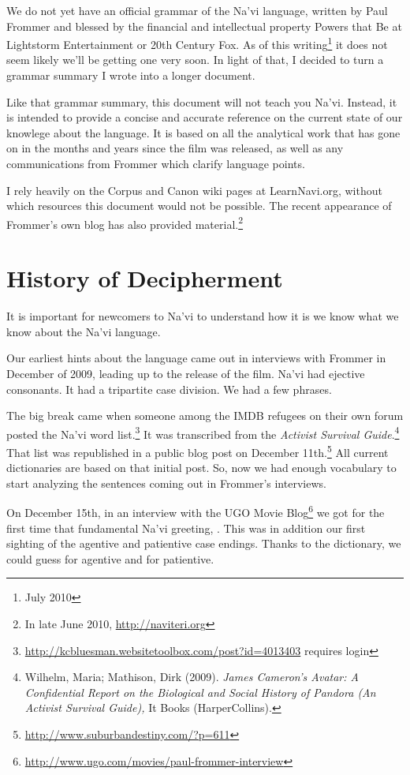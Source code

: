 
We do not yet have an official grammar of the Na'vi language, written
by Paul Frommer and blessed by the financial and intellectual property
Powers that Be at Lightstorm Entertainment or 20th Century Fox.  As of
this writing\footnote{July 2010} it does not seem likely we'll be
getting one very soon. In light of that, I decided to turn a grammar
summary I wrote into a longer document.

Like that grammar summary, this document will not teach you Na'vi.
Instead, it is intended to provide a concise and accurate reference on
the current state of our knowlege about the language.  It is based on
all the analytical work that has gone on in the months and years since
the film was released, as well as any communications from Frommer
which clarify language points.

I rely heavily on the Corpus and Canon wiki pages at LearnNavi.org,
without which resources this document would not be possible.  The
recent appearance of Frommer's own blog has also provided
material.\footnote{In late June 2010, \url{http://naviteri.org}}


\section{History of Decipherment}
It is important for newcomers to Na'vi to understand how it is we know
what we know about the Na'vi language.

Our earliest hints about the language came out in interviews with
Frommer in December of 2009, leading up to the release of the film.
Na'vi had ejective consonants.  It had a tripartite case division.  We
had a few phrases.

The big break came when someone among the IMDB refugees on their own
forum posted the Na'vi word
list.\footnote{\url{http://kcbluesman.websitetoolbox.com/post?id=4013403}
requires login}  It was transcribed from the \textit{Activist
Survival Guide}.\footnote{Wilhelm, Maria; Mathison, Dirk (2009). \textit{James
Cameron's Avatar: A Confidential Report on the Biological and Social
History of Pandora (An Activist Survival Guide),} It Books (HarperCollins).}
That list was republished in a public blog post on December
11th.\footnote{\url{http://www.suburbandestiny.com/?p=611}} All
current dictionaries are based on that initial post.  So, now we had
enough vocabulary to start analyzing the sentences coming out in
Frommer's interviews.

On December 15th, in an interview with the UGO Movie
Blog\footnote{\url{http://www.ugo.com/movies/paul-frommer-interview}}
we got for the first time that fundamental Na'vi greeting,  .  This was in addition our first
sighting of the agentive and patientive case endings.  Thanks to the
dictionary, we could guess  for agentive and  for
patientive.

